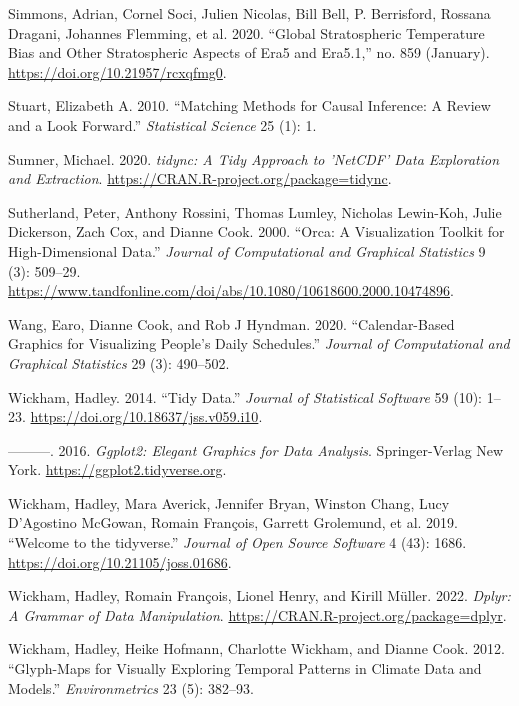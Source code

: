 \documentclass{article}
\newlength{\cslhangindent}
\newlength{\cslentryspacingunit} %
\newenvironment{CSLReferences}[2] %
 {%
  \setlength{\parindent}{0pt}
  \ifodd #1
  \let\oldpar\par
  \def\par{\hangindent=\cslhangindent\oldpar}
  \fi
  \setlength{\parskip}{#2\cslentryspacingunit}
 }%
 {}
\begin{document}
\begin{CSLReferences}{1}{0}
\leavevmode\hypertarget{ref-simmons2020global}{}%
Simmons, Adrian, Cornel Soci, Julien Nicolas, Bill Bell, P. Berrisford, Rossana Dragani, Johannes Flemming, et al. 2020. {``Global Stratospheric Temperature Bias and Other Stratospheric Aspects of Era5 and Era5.1,''} no. 859 (January). \url{https://doi.org/10.21957/rcxqfmg0}.

\leavevmode\hypertarget{ref-stuart2010matching}{}%
Stuart, Elizabeth A. 2010. {``Matching Methods for Causal Inference: A Review and a Look Forward.''} \emph{Statistical Science} 25 (1): 1.

\leavevmode\hypertarget{ref-tidync}{}%
Sumner, Michael. 2020. \emph{{tidync}: A Tidy Approach to 'NetCDF' Data Exploration and Extraction}. \url{https://CRAN.R-project.org/package=tidync}.

\leavevmode\hypertarget{ref-sutherland2000orca}{}%
Sutherland, Peter, Anthony Rossini, Thomas Lumley, Nicholas Lewin-Koh, Julie Dickerson, Zach Cox, and Dianne Cook. 2000. {``{Orca}: A Visualization Toolkit for High-Dimensional Data.''} \emph{Journal of Computational and Graphical Statistics} 9 (3): 509--29. \url{https://www.tandfonline.com/doi/abs/10.1080/10618600.2000.10474896}.

\leavevmode\hypertarget{ref-wang2020calendar}{}%
Wang, Earo, Dianne Cook, and Rob J Hyndman. 2020. {``Calendar-Based Graphics for Visualizing People's Daily Schedules.''} \emph{Journal of Computational and Graphical Statistics} 29 (3): 490--502.

\leavevmode\hypertarget{ref-tidydata}{}%
Wickham, Hadley. 2014. {``Tidy Data.''} \emph{Journal of Statistical Software} 59 (10): 1--23. \url{https://doi.org/10.18637/jss.v059.i10}.

\leavevmode\hypertarget{ref-ggplot2}{}%
---------. 2016. \emph{Ggplot2: Elegant Graphics for Data Analysis}. Springer-Verlag New York. \url{https://ggplot2.tidyverse.org}.

\leavevmode\hypertarget{ref-tidyverse}{}%
Wickham, Hadley, Mara Averick, Jennifer Bryan, Winston Chang, Lucy D'Agostino McGowan, Romain François, Garrett Grolemund, et al. 2019. {``Welcome to the {tidyverse}.''} \emph{Journal of Open Source Software} 4 (43): 1686. \url{https://doi.org/10.21105/joss.01686}.

\leavevmode\hypertarget{ref-dplyr}{}%
Wickham, Hadley, Romain François, Lionel Henry, and Kirill Müller. 2022. \emph{Dplyr: A Grammar of Data Manipulation}. \url{https://CRAN.R-project.org/package=dplyr}.

\leavevmode\hypertarget{ref-Wickham2012-yr}{}%
Wickham, Hadley, Heike Hofmann, Charlotte Wickham, and Dianne Cook. 2012. {``Glyph-Maps for Visually Exploring Temporal Patterns in Climate Data and Models.''} \emph{Environmetrics} 23 (5): 382--93.


\end{CSLReferences}
\end{document}
